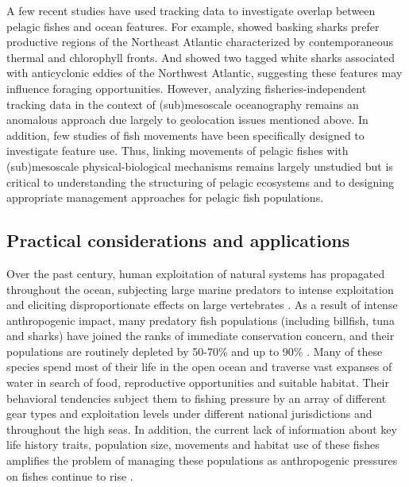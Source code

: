 A few recent studies have used tracking data to investigate overlap between pelagic fishes and ocean features. For example, \cite{Miller2015} showed basking sharks prefer productive regions of the Northeast Atlantic characterized by contemporaneous thermal and chlorophyll fronts. And \cite{Gaube2018} showed two tagged white sharks associated with anticyclonic eddies of the Northwest Atlantic, suggesting these features may influence foraging opportunities. However, analyzing fisheries-independent tracking data in the context of (sub)mesoscale oceanography remains an anomalous approach due largely to geolocation issues mentioned above. In addition, few studies of fish movements have been specifically designed to investigate feature use. Thus, linking movements of pelagic fishes with (sub)mesoscale physical-biological mechanisms remains largely unstudied but is critical to understanding the structuring of pelagic ecosystems and to designing appropriate management approaches for pelagic fish populations.

\subsection{Practical considerations and applications}
 
 Over the past century, human exploitation of natural systems has propagated throughout the ocean, subjecting large marine predators to intense exploitation \citep{Byrne2017} and eliciting disproportionate effects on large vertebrates \citep{Jackson2001, Baum2003}. As a result of intense anthropogenic impact, many predatory fish populations (including billfish, tuna and sharks) have joined the ranks of immediate conservation concern, and their populations are routinely depleted by 50-70\% \citep{Hilborn2003} and up to 90\% \citep{Myers2005}. Many of these species spend most of their life in the open ocean and traverse vast expanses of water in search of food, reproductive opportunities and suitable habitat. Their behavioral tendencies subject them to fishing pressure by an array of different gear types and exploitation levels under different national jurisdictions and throughout the high seas. In addition, the current lack of information about key life history traits, population size, movements and habitat use of these fishes amplifies the problem of managing these populations as anthropogenic pressures on fishes continue to rise \citep{Dulvy2008, Ferretti2010}.

